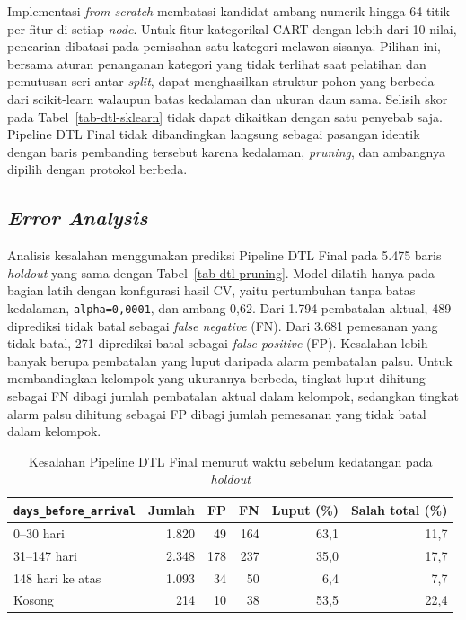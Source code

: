 Implementasi \textit{from scratch} membatasi kandidat ambang numerik hingga 64 titik per fitur di setiap \textit{node}. Untuk fitur kategorikal CART dengan lebih dari 10 nilai, pencarian dibatasi pada pemisahan satu kategori melawan sisanya. Pilihan ini, bersama aturan penanganan kategori yang tidak terlihat saat pelatihan dan pemutusan seri antar-\textit{split}, dapat menghasilkan struktur pohon yang berbeda dari scikit-learn walaupun batas kedalaman dan ukuran daun sama. Selisih skor pada Tabel~\ref{tab-dtl-sklearn} tidak dapat dikaitkan dengan satu penyebab saja. Pipeline DTL Final tidak dibandingkan langsung sebagai pasangan identik dengan baris pembanding tersebut karena kedalaman, \textit{pruning}, dan ambangnya dipilih dengan protokol berbeda.

\subsection{\textit{Error Analysis}}

Analisis kesalahan menggunakan prediksi Pipeline DTL Final pada 5.475 baris \textit{holdout} yang sama dengan Tabel~\ref{tab-dtl-pruning}. Model dilatih hanya pada bagian latih dengan konfigurasi hasil CV, yaitu pertumbuhan tanpa batas kedalaman, \texttt{alpha=0,0001}, dan ambang 0,62. Dari 1.794 pembatalan aktual, 489 diprediksi tidak batal sebagai \textit{false negative} (FN). Dari 3.681 pemesanan yang tidak batal, 271 diprediksi batal sebagai \textit{false positive} (FP). Kesalahan lebih banyak berupa pembatalan yang luput daripada alarm pembatalan palsu. Untuk membandingkan kelompok yang ukurannya berbeda, tingkat luput dihitung sebagai FN dibagi jumlah pembatalan aktual dalam kelompok, sedangkan tingkat alarm palsu dihitung sebagai FP dibagi jumlah pemesanan yang tidak batal dalam kelompok.

\begin{table}[H]
    \centering
    \caption{Kesalahan Pipeline DTL Final menurut waktu sebelum kedatangan pada \textit{holdout}}
    \label{tab-dtl-error-days}
    \begin{tabular}{lrrrrr}
        \hline
        \texttt{days\_before\_arrival} & Jumlah & FP  & FN  & Luput (\%) & Salah total (\%) \\
        \hline
        0--30 hari                     & 1.820  & 49  & 164 & 63,1       & 11,7             \\
        31--147 hari                   & 2.348  & 178 & 237 & 35,0       & 17,7             \\
        148 hari ke atas               & 1.093  & 34  & 50  & 6,4        & 7,7              \\
        Kosong                         & 214    & 10  & 38  & 53,5       & 22,4             \\
        \hline
    \end{tabular}
\end{table}

